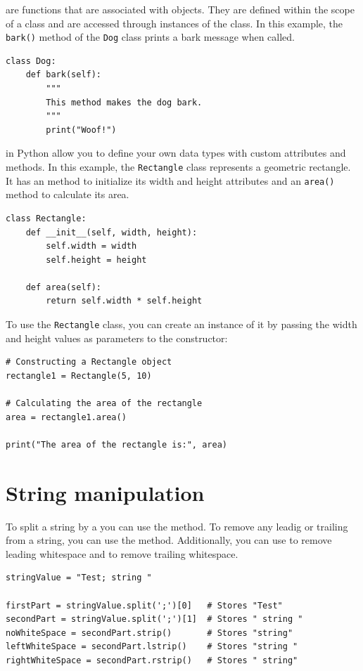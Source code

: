  are functions that are associated with objects. They are defined within the scope of a class and are accessed through instances of the class. In this example, the \texttt{bark()} method of the \texttt{Dog} class prints a bark message when called.
\begin{lstlisting}
class Dog:
    def bark(self):
        """
        This method makes the dog bark.
        """
        print("Woof!")
\end{lstlisting}

 in Python allow you to define your own data types with custom attributes and methods. In this example, the \texttt{Rectangle} class represents a geometric rectangle. It has an  method to initialize its width and height attributes and an \texttt{area()} method to calculate its area.
\begin{lstlisting}
class Rectangle:
    def __init__(self, width, height):
        self.width = width
        self.height = height
        
    def area(self):
        return self.width * self.height
\end{lstlisting}

To use the \texttt{Rectangle} class, you can create an instance of it by passing the width and height values as parameters to the constructor:
\begin{lstlisting}
# Constructing a Rectangle object
rectangle1 = Rectangle(5, 10)

# Calculating the area of the rectangle
area = rectangle1.area()

print("The area of the rectangle is:", area)
\end{lstlisting}








\section{String manipulation}

To split a string by a  you can use the  method. To remove any leadig or trailing  from a string, you can use the  method. Additionally, you can use  to remove leading whitespace and  to remove trailing whitespace.
\begin{lstlisting}
stringValue = "Test; string "

firstPart = stringValue.split(';')[0] 	# Stores "Test"
secondPart = stringValue.split(';')[1]	# Stores " string "
noWhiteSpace = secondPart.strip()       # Stores "string"
leftWhiteSpace = secondPart.lstrip()    # Stores "string "
rightWhiteSpace = secondPart.rstrip()   # Stores " string"
\end{lstlisting}

